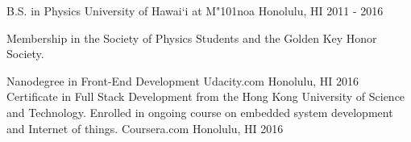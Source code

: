 \begin{cventries}
	\cventry
	{B.S. in Physics}
	{University of Hawai`i at M{\char"101}noa}
	{Honolulu, HI}
	{2011 - 2016}
	{
	  \begin{cvitems}
	    \item {Membership in the Society of Physics Students and the Golden Key Honor Society.}
	  \end{cvitems}
	}
	\cventry
	{Nanodegree in Front-End Development}
	{Udacity.com}
	{Honolulu, HI}
	{2016}
	{}  
	\cventry
	{Certificate in Full Stack Development from the Hong Kong University of Science and Technology. Enrolled in ongoing course on embedded system development and Internet of things.}
	{Coursera.com}
	{Honolulu, HI}
	{2016}
	{}  
\end{cventries}
